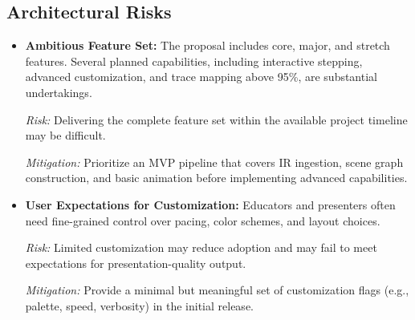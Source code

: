 \subsection{Architectural Risks}
\begin{itemize}
  \item \textbf{Ambitious Feature Set:} The proposal includes core, major, and stretch features. Several planned capabilities, including interactive stepping, advanced customization, and trace mapping above 95\%, are substantial undertakings.\par
  {\raggedright\textit{Risk:} Delivering the complete feature set within the available project timeline may be difficult.\par}
  {\raggedright\textit{Mitigation:} Prioritize an MVP pipeline that covers IR ingestion, scene graph construction, and basic animation before implementing advanced capabilities.\par}

  \item \textbf{User Expectations for Customization:} Educators and presenters often need fine-grained control over pacing, color schemes, and layout choices.\par
  {\raggedright\textit{Risk:} Limited customization may reduce adoption and may fail to meet expectations for presentation-quality output.\par}
  {\raggedright\textit{Mitigation:} Provide a minimal but meaningful set of customization flags (e.g., palette, speed, verbosity) in the initial release.\par}
\end{itemize}
